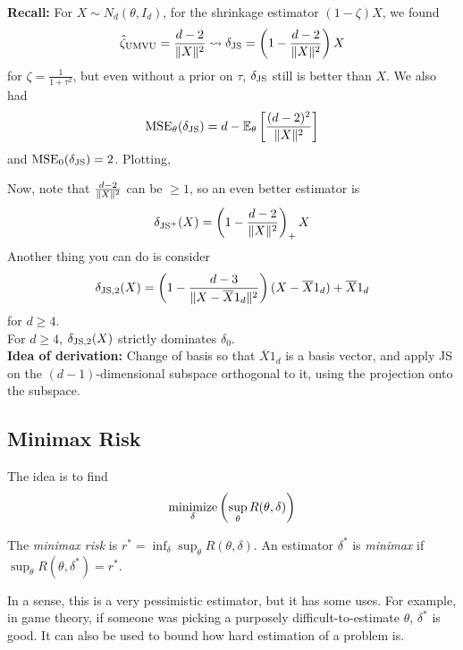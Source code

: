 
\textbf{Recall:} For $X \sim N_d(\theta, I_d)$, for the shrinkage estimator $(1 - \zeta)X$, we found
\[ \hat{\zeta}_{\tt{UMVU}} = \frac{d - 2}{\norm{X}^2} \rightsquigarrow \delta_{\tt{JS}} = \left(1 - \frac{d - 2}{\norm{X}^2}\right)X \]
for $\zeta = \frac{1}{1 + \tau^2}$, but even without a prior on $\tau$, $\delta_{\tt{JS}}$ still is better than $X$. We also had
\[ \tt{MSE}_{\theta}(\delta_{\tt{JS}}) = d - \E_{\theta}\left[\frac{(d - 2)^2}{\norm{X}^2}\right] \]
and $\tt{MSE}_0(\delta_{\tt{JS}}) = 2$. Plotting,

Now, note that $\frac{d - 2}{\norm{X}^2}$ can be $\geq 1$, so an even better estimator is
\[ \delta_{\tt{JS}^{+}}(X) = \left(1 - \frac{d - 2}{\norm{X}^2}\right)_{+}X \]
Another thing you can do is consider
\[ \delta_{\tt{JS}, 2}(X) = \left(1 - \frac{d - 3}{\norm{X - \overline{X}1_d}^2}\right)(X - \overline{X}1_d) + \overline{X}1_d \]
for $d \geq 4$.\\

For $d \geq 4$, $\delta_{\tt{JS}, 2}(X)$ strictly dominates $\delta_0$.\\

\textbf{Idea of derivation:} Change of basis so that $\overline{X}1_d$ is a basis vector, and apply JS on the $(d - 1)$-dimensional subspace orthogonal to it, using the projection onto the subspace.

\subsection*{Minimax Risk}
\sectionspace

The idea is to find
\[ \underset{\delta}{\tt{minimize}}\left(\sup_{\theta} R(\theta, \delta)\right) \]

\begin{definition}
    The \emph{minimax risk} is $r^{*} = \inf_{\delta}\sup_{\theta} R(\theta, \delta)$. An estimator $\delta^{*}$ is \emph{minimax} if $\sup_{\theta} R(\theta, \delta^{*}) = r^{*}$.
\end{definition}

In a sense, this is a very pessimistic estimator, but it has some uses. For example, in game theory, if someone was picking a purposely difficult-to-estimate $\theta$, $\delta^{*}$ is good. It can also be used to bound how hard estimation of a problem is.\\

